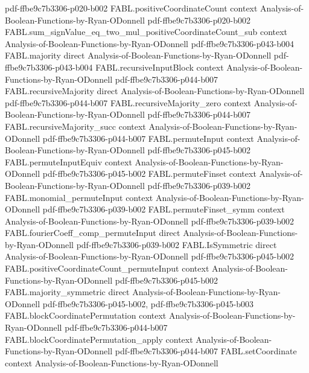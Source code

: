 \begin{theorem}
  {pdf-ffbe9c7b3306-p020-b002}
\proofstep
  {FABL.positiveCoordinateCount}
  {context}
  {Analysis-of-Boolean-Functions-by-Ryan-ODonnell}
  {pdf-ffbe9c7b3306-p020-b002}
\proofstep
  {FABL.sum_signValue_eq_two_mul_positiveCoordinateCount_sub}
  {context}
  {Analysis-of-Boolean-Functions-by-Ryan-ODonnell}
  {pdf-ffbe9c7b3306-p043-b004}
\proofstep
  {FABL.majority}
  {direct}
  {Analysis-of-Boolean-Functions-by-Ryan-ODonnell}
  {pdf-ffbe9c7b3306-p043-b004}
\proofstep
  {FABL.recursiveInputBlock}
  {context}
  {Analysis-of-Boolean-Functions-by-Ryan-ODonnell}
  {pdf-ffbe9c7b3306-p044-b007}
\proofstep
  {FABL.recursiveMajority}
  {direct}
  {Analysis-of-Boolean-Functions-by-Ryan-ODonnell}
  {pdf-ffbe9c7b3306-p044-b007}
\proofstep
  {FABL.recursiveMajority_zero}
  {context}
  {Analysis-of-Boolean-Functions-by-Ryan-ODonnell}
  {pdf-ffbe9c7b3306-p044-b007}
\proofstep
  {FABL.recursiveMajority_succ}
  {context}
  {Analysis-of-Boolean-Functions-by-Ryan-ODonnell}
  {pdf-ffbe9c7b3306-p044-b007}
\proofstep
  {FABL.permuteInput}
  {context}
  {Analysis-of-Boolean-Functions-by-Ryan-ODonnell}
  {pdf-ffbe9c7b3306-p045-b002}
\proofstep
  {FABL.permuteInputEquiv}
  {context}
  {Analysis-of-Boolean-Functions-by-Ryan-ODonnell}
  {pdf-ffbe9c7b3306-p045-b002}
\proofstep
  {FABL.permuteFinset}
  {context}
  {Analysis-of-Boolean-Functions-by-Ryan-ODonnell}
  {pdf-ffbe9c7b3306-p039-b002}
\proofstep
  {FABL.monomial_permuteInput}
  {context}
  {Analysis-of-Boolean-Functions-by-Ryan-ODonnell}
  {pdf-ffbe9c7b3306-p039-b002}
\proofstep
  {FABL.permuteFinset_symm}
  {context}
  {Analysis-of-Boolean-Functions-by-Ryan-ODonnell}
  {pdf-ffbe9c7b3306-p039-b002}
\proofstep
  {FABL.fourierCoeff_comp_permuteInput}
  {direct}
  {Analysis-of-Boolean-Functions-by-Ryan-ODonnell}
  {pdf-ffbe9c7b3306-p039-b002}
\proofstep
  {FABL.IsSymmetric}
  {direct}
  {Analysis-of-Boolean-Functions-by-Ryan-ODonnell}
  {pdf-ffbe9c7b3306-p045-b002}
\proofstep
  {FABL.positiveCoordinateCount_permuteInput}
  {context}
  {Analysis-of-Boolean-Functions-by-Ryan-ODonnell}
  {pdf-ffbe9c7b3306-p045-b002}
\proofstep
  {FABL.majority_symmetric}
  {direct}
  {Analysis-of-Boolean-Functions-by-Ryan-ODonnell}
  {pdf-ffbe9c7b3306-p045-b002,
    pdf-ffbe9c7b3306-p045-b003}
\proofstep
  {FABL.blockCoordinatePermutation}
  {context}
  {Analysis-of-Boolean-Functions-by-Ryan-ODonnell}
  {pdf-ffbe9c7b3306-p044-b007}
\proofstep
  {FABL.blockCoordinatePermutation_apply}
  {context}
  {Analysis-of-Boolean-Functions-by-Ryan-ODonnell}
  {pdf-ffbe9c7b3306-p044-b007}
\proofstep
  {FABL.setCoordinate}
  {context}
  {Analysis-of-Boolean-Functions-by-Ryan-ODonnell}

\end{theorem}
